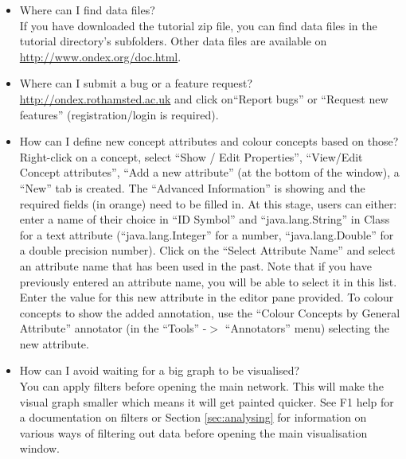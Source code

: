 \begin{itemize}
\item Where can I find data files?\\
If you have downloaded the tutorial zip file, you can find data files in the tutorial directory's subfolders.
Other data files are available on \url{http://www.ondex.org/doc.html}.

\item Where can I submit a bug or a feature request?\\
\url{http://ondex.rothamsted.ac.uk} and click on``Report bugs'' or ``Request new features'' (registration/login is required).

\item How can I define new concept attributes and colour concepts based on those?\\
Right-click on a concept, select ``Show / Edit Properties'', ``View/Edit Concept attributes'', ``Add a new attribute'' (at the bottom of the window),
a ``New'' tab is created. The ``Advanced Information'' is showing and the required fields (in orange) need to be filled in. At this stage, users can either:
enter a name of their choice in ``ID Symbol'' and ``java.lang.String'' in Class for a text attribute 
(``java.lang.Integer'' for a number, ``java.lang.Double'' for a double precision number).
Click on the ``Select Attribute Name'' and select an attribute name that has been used in the past. 
Note that if you have previously entered an attribute name, you will be able to select it in this list.
Enter the value for this new attribute in the editor pane provided.
To colour concepts to show the added annotation, use the ``Colour Concepts by General Attribute'' annotator (in the ``Tools'' -$>$ ``Annotators'' menu) 
selecting the new attribute.

\item How can I avoid waiting for a big graph to be visualised?\\
You can apply filters before opening the main network. 
This will make the visual graph smaller which means it will get painted quicker.
See F1 help for a documentation on filters or Section \ref{sec:analysing} for information on various ways of filtering out data before opening the main visualisation window.


\end{itemize}
